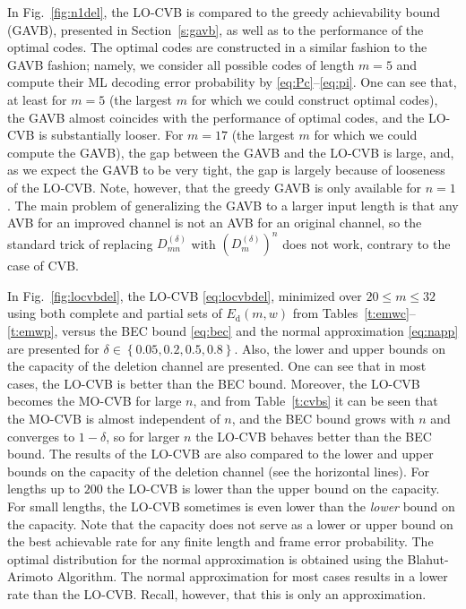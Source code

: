 \documentclass[journal, twocol]{IEEEtran}
\newcommand{\Ed}{{E_{\text{d}}}}
\newcommand{\set}[1]{{\left\{{#1}\right\}}}
\begin{document}
In Fig.~\ref{fig:n1del}, the LO-CVB is compared to the greedy achievability bound (GAVB), presented in Section~\ref{s:gavb}, as well as to the performance of the optimal codes.
The optimal codes are constructed in a similar fashion to the GAVB fashion; namely, we consider all possible codes of length $m=5$ and compute their ML decoding error probability by \eqref{eq:Pc}--\eqref{eq:pi}.
One can see that, at least for $m=5$ (the largest $m$ for which we could construct optimal codes), the GAVB almost coincides with the performance of optimal codes, and the LO-CVB is substantially looser.
For $m=17$ (the largest $m$ for which we could compute the GAVB), the gap between the GAVB and the LO-CVB is large, and, as we expect the GAVB to be very tight, the gap is largely because of looseness of the LO-CVB.
Note, however, that the greedy GAVB is only available for $n=1$.
The main problem of generalizing the GAVB to a larger input length is that any AVB for an improved channel is not an AVB for an original channel, so the standard trick of replacing $D_{mn}^{(\delta)}$ with $(D_{m}^{(\delta)})^n$ does not work, contrary to the case of CVB.

In Fig.~\ref{fig:locvbdel}, the LO-CVB \eqref{eq:locvbdel}, minimized over $20\leq m \leq 32$ using both complete and partial sets of $\Ed(m,w)$ from Tables~\ref{t:emwc}--\ref{t:emwp}, versus the BEC bound \eqref{eq:bec} and the normal approximation \eqref{eq:napp} are presented for $\delta\in\set{0.05,0.2,0.5,0.8}$.
Also, the lower and upper bounds \cite{fertonani10novel} on the capacity of the deletion channel are presented. 
One can see that in most cases, the LO-CVB is better than the BEC bound.
Moreover, the LO-CVB becomes the MO-CVB for large $n$, and from Table~\ref{t:cvbs} it can be seen that the MO-CVB is almost independent of $n$, and the BEC bound grows with $n$ and converges to $1-\delta$, so for larger $n$ the LO-CVB behaves better than the BEC bound.
The results of the LO-CVB are also compared to the lower \cite{fertonani10novel} and upper \cite{rahmati15upper} bounds on the capacity of the deletion channel (see the horizontal lines).
For lengths up to $200$ the LO-CVB is lower than the upper bound on the capacity.
For small lengths, the LO-CVB sometimes is even lower than the \emph{lower} bound on the capacity.
Note that the capacity does not serve as a lower or upper bound on the best achievable rate for any finite length and frame error probability.
The optimal distribution for the normal approximation is obtained using the Blahut-Arimoto Algorithm.
The normal approximation for most cases results in a lower rate than the LO-CVB. Recall, however, that this is only an approximation.
\end{document}
